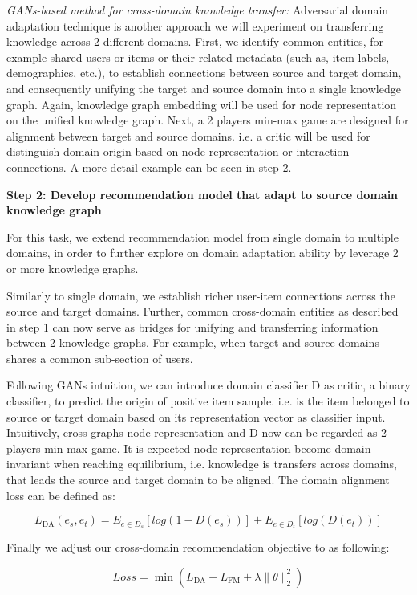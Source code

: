 \textit{GANs-based method for cross-domain knowledge transfer:}
Adversarial domain adaptation technique is another approach we will experiment on transferring knowledge across 2 different domains.
First, we identify common entities, for example shared users or items or their related metadata (such as, item labels, demographics, etc.), to establish connections between source and target domain, and consequently unifying the target and source domain into a single knowledge graph.
Again, knowledge graph embedding will be used for node representation on the unified knowledge graph. Next, a 2 players min-max game are designed for alignment between target and source domains. i.e. a critic will be used for distinguish domain origin based on node representation or interaction connections. A more detail example can be seen in step 2.


\textbf{Step 2: Develop recommendation model that adapt to source domain knowledge graph}

For this task, we extend recommendation model from single domain to multiple domains, in order to further explore on domain adaptation ability by leverage 2 or more knowledge graphs.

Similarly to single domain, we establish richer user-item connections across the source and target domains. Further, common cross-domain entities as described in step 1 can now serve as bridges for unifying and transferring information between 2 knowledge graphs.
For example, when target and source domains shares a common sub-section of users.

Following GANs intuition, we can introduce domain classifier D as critic, a binary classifier, to predict the origin of positive item sample. i.e. is the item belonged to source or target domain based on its representation vector as classifier input. Intuitively, cross graphs node representation and D now can be regarded as 2 players min-max game. It is expected node representation become domain-invariant when reaching equilibrium, i.e. knowledge is transfers across domains, that leads the source and target domain to be aligned. The domain alignment loss can be defined as:

\begin{equation}
    L_\text{DA}(e_s,e_t)=E_{e \in D_s}[log(1-D(e_s))] + E_{e \in D_t}[log(D(e_t))]
\end{equation}

Finally we adjust our cross-domain recommendation objective to as following:

\begin{equation}
    Loss=\min{(L_\text{DA}+L_\text{FM}+\lambda\|\theta\|^2_2)}
\end{equation}



